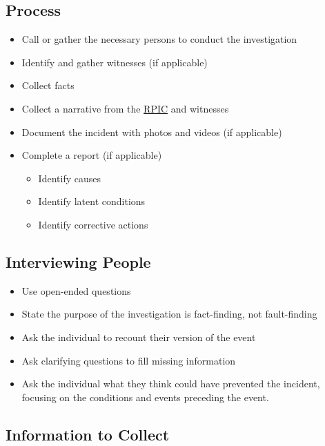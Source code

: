 \documentclass[
]{book}
\providecommand{\tightlist}{%
  \setlength{\itemsep}{0pt}\setlength{\parskip}{0pt}}
\begin{document}
\hypertarget{process}{%
\subsection{Process}\label{process}}

\begin{itemize}
\item
  Call or gather the necessary persons to conduct the investigation
\item
  Identify and gather witnesses (if applicable)
\item
  Collect facts
\item
  Collect a narrative from the \protect\hyperlink{RPIC}{RPIC} and witnesses
\item
  Document the incident with photos and videos (if applicable)
\item
  Complete a report (if applicable)

  \begin{itemize}
  \tightlist
  \item
    Identify causes
  \item
    Identify latent conditions
  \item
    Identify corrective actions
  \end{itemize}
\end{itemize}

\hypertarget{interviewing-people}{%
\subsection{Interviewing People}\label{interviewing-people}}

\begin{itemize}
\tightlist
\item
  Use open-ended questions
\item
  State the purpose of the investigation is fact-finding, not fault-finding
\item
  Ask the individual to recount their version of the event
\item
  Ask clarifying questions to fill missing information
\item
  Ask the individual what they think could have prevented the incident, focusing on the conditions and events preceding the event.
\end{itemize}

\hypertarget{information-to-collect}{%
\subsection{Information to Collect}\label{information-to-collect}}
\end{document}
